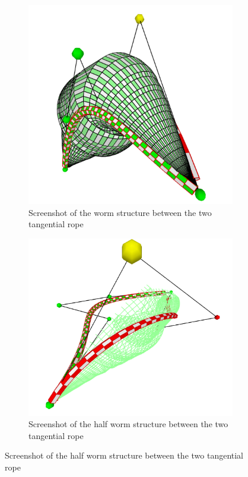 \documentclass[twoside,11pt]{article}
\begin{document}
\begin{figure} [H]
\begin{figure} [H]
    \centering
    \includegraphics[width=04in]{wormFull2.png}
    \caption{Screenshot of the worm structure between the two tangential rope}
\end{figure}


\begin{figure} [H]
    \centering
    \includegraphics[width=04in]{wormHalf.png}
    \caption{Screenshot of the half worm structure between the two tangential rope}
\end{figure}


\end{figure}
\end{document}

